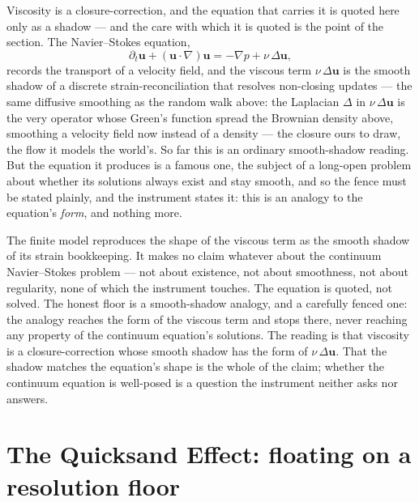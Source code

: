 Viscosity is a closure-correction, and the equation that carries it is quoted here only as a shadow --- and
the care with which it is quoted is the point of the section. The Navier--Stokes equation,
\begin{equation}
  \partial_t \mathbf{u} + (\mathbf{u}\cdot\nabla)\mathbf{u} = -\nabla p + \nu\,\Delta\mathbf{u},
\end{equation}
records the transport of a velocity field, and the viscous term $\nu\,\Delta\mathbf{u}$ is the smooth shadow
of a discrete strain-reconciliation that resolves non-closing updates --- the same diffusive smoothing as the
random walk above: the Laplacian $\Delta$ in $\nu\,\Delta\mathbf{u}$ is the very operator whose Green's
function spread the Brownian density above, smoothing a velocity field now instead of a density --- the closure ours to draw, the flow it models the
world's. So far this is an ordinary smooth-shadow reading.
But the equation it produces is a famous one, the subject of a long-open problem about whether its solutions
always exist and stay smooth, and so the fence must be stated plainly, and the instrument states it: this is an
analogy to the equation's \emph{form}, and nothing more.

The finite model reproduces the shape of the viscous term as the smooth shadow of its strain bookkeeping. It
makes no claim whatever about the continuum Navier--Stokes problem --- not about existence, not about
smoothness, not about regularity, none of which the instrument touches. The equation is quoted, not solved. The
honest floor is a smooth-shadow analogy, and a carefully fenced one: the analogy reaches the form of the
viscous term and stops there, never reaching any property of the continuum equation's solutions. The reading
is that viscosity is a closure-correction whose smooth shadow has the form of
$\nu\,\Delta\mathbf{u}$. That the shadow matches the equation's shape is the whole of the claim; whether the
continuum equation is well-posed is a question the instrument neither asks nor answers.

\section{The Quicksand Effect: floating on a resolution floor}
\label{se:quicksand}

